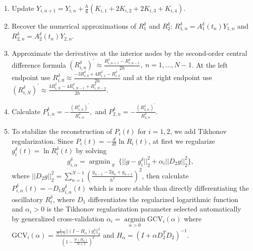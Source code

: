 \documentclass[preprint,12pt,authoryear]{elsarticle}
\DeclareMathOperator\argmin{argmin}
\begin{document}
\begin{enumerate}
\item Update $Y_{i,n+1}=Y_{i,n}+\frac{h}{6}\left(K_{i,1}+2K_{i,2}+2K_{i,3}+K_{i,4}
\right)$.

\item Recover the numerical approximations of $R_1^{\delta}$ and $R_2^{\delta}$: $R_{1,n}^{\delta}=A_1^{\delta}(t_n)Y_{1,n}$ and $R_{2,n}^{\delta}=A_2^{\delta}(t_n)Y_{2,n}.$

\item Approximate the derivatives at the interior nodes by the second-order central difference formula $(R_{i,n}^{\delta})^{\prime}
\approx
\frac{R_{i,n+1}^{\delta}-R_{i,n-1}^{\delta}}{2h},
\;
n=1,\ldots,N-1$. At the left endpoint use $R_{i,0}^{\delta}
\approx\frac{-3R_{i,0}^{\delta}+4R_{i,1}^{\delta}-R_{i,2}^{\delta}}{2h}$
and at the right endpoint use $(R_{i,N}^{\delta})^{\prime}
\approx\frac{3R_{i,N}^{\delta}-4R_{i,N-1}^{\delta}+R_{i,N-2}^{\delta}}{2h}$.

\item Calculate $P_{1,n}^{\delta}=-\frac{(R_{1,n}^{\delta})^{\prime}}{R_{1,n}^{\delta}},$ and $P_{2,n}^{\delta}=-\frac{(R_{2,n}^{\delta})^{\prime}}{R_{2,n}^{\delta}}.$

\item To stabilize the reconstruction of $P_i(t)$ for $i=1,2$, we add Tikhonov regularization. Since $P_i(t)=-\frac{d}{dt}\ln R_i(t)$, at first we regularize $g_i^{\delta}(t)=\ln R_i^{\delta}(t)$ by solving 
$$g_{i,\alpha}^{\delta}=\argmin_{\substack{g}}\{||g-g_i^{\delta}||_2^2+\alpha_i||D_2 g||_2^2\},$$
where $||D_2g||_2^2=\sum_{n=1}^{N-1}\left(\frac{g_{n-1}-2g_n+g_{n+1}}{h^2}\right)^2$, then calculate $P_{i,\alpha}^{\delta}(t)=-D_1g_{i,\alpha}^{\delta}(t)$ which is more stable than directly differentiating the oscillatory $R_i^{\delta}$, where $D_1$ differentiates the regularized logarithmic function and $\alpha_i>0$ is the Tikhonov regularization parameter selected automatically by generalized cross-validation $\alpha_i=\argmin\limits_{\alpha>0}\text{GCV}_i(\alpha)$ where $\text{GCV}_i(\alpha)=\frac{\frac{1}{N+1}||(I-H_{\alpha})g_i^{\delta}||_2^2}{\left(1-\frac{\text{tr}(H_{\alpha})}{N+1}\right)^2}$ and $H_{\alpha}=(I+\alpha D_2^{T}D_2)^{-1}$.
\end{enumerate}
\end{document}
